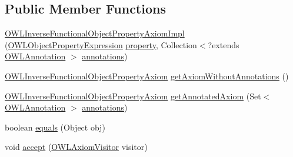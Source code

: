 \subsection*{Public Member Functions}
\begin{DoxyCompactItemize}
\item 
\hyperlink{classuk_1_1ac_1_1manchester_1_1cs_1_1owl_1_1owlapi_1_1_o_w_l_inverse_functional_object_property_axiom_impl_a158a604f393929da553f4415b8658a03}{O\-W\-L\-Inverse\-Functional\-Object\-Property\-Axiom\-Impl} (\hyperlink{interfaceorg_1_1semanticweb_1_1owlapi_1_1model_1_1_o_w_l_object_property_expression}{O\-W\-L\-Object\-Property\-Expression} \hyperlink{classuk_1_1ac_1_1manchester_1_1cs_1_1owl_1_1owlapi_1_1_o_w_l_object_property_characteristic_axiom_impl_ac99438140edc10b050c93559f367cdbb}{property}, Collection$<$?extends \hyperlink{interfaceorg_1_1semanticweb_1_1owlapi_1_1model_1_1_o_w_l_annotation}{O\-W\-L\-Annotation} $>$ \hyperlink{classuk_1_1ac_1_1manchester_1_1cs_1_1owl_1_1owlapi_1_1_o_w_l_axiom_impl_af6fbf6188f7bdcdc6bef5766feed695e}{annotations})
\item 
\hyperlink{interfaceorg_1_1semanticweb_1_1owlapi_1_1model_1_1_o_w_l_inverse_functional_object_property_axiom}{O\-W\-L\-Inverse\-Functional\-Object\-Property\-Axiom} \hyperlink{classuk_1_1ac_1_1manchester_1_1cs_1_1owl_1_1owlapi_1_1_o_w_l_inverse_functional_object_property_axiom_impl_ace7b12584d70637071a17d8d198127e3}{get\-Axiom\-Without\-Annotations} ()
\item 
\hyperlink{interfaceorg_1_1semanticweb_1_1owlapi_1_1model_1_1_o_w_l_inverse_functional_object_property_axiom}{O\-W\-L\-Inverse\-Functional\-Object\-Property\-Axiom} \hyperlink{classuk_1_1ac_1_1manchester_1_1cs_1_1owl_1_1owlapi_1_1_o_w_l_inverse_functional_object_property_axiom_impl_a1d3229fd67e0a6505d177259ece4ce31}{get\-Annotated\-Axiom} (Set$<$ \hyperlink{interfaceorg_1_1semanticweb_1_1owlapi_1_1model_1_1_o_w_l_annotation}{O\-W\-L\-Annotation} $>$ \hyperlink{classuk_1_1ac_1_1manchester_1_1cs_1_1owl_1_1owlapi_1_1_o_w_l_axiom_impl_af6fbf6188f7bdcdc6bef5766feed695e}{annotations})
\item 
boolean \hyperlink{classuk_1_1ac_1_1manchester_1_1cs_1_1owl_1_1owlapi_1_1_o_w_l_inverse_functional_object_property_axiom_impl_a452279893f62db9350f4e601614f25f0}{equals} (Object obj)
\item 
void \hyperlink{classuk_1_1ac_1_1manchester_1_1cs_1_1owl_1_1owlapi_1_1_o_w_l_inverse_functional_object_property_axiom_impl_a8533fa9482739c355a72c58491fcc3de}{accept} (\hyperlink{interfaceorg_1_1semanticweb_1_1owlapi_1_1model_1_1_o_w_l_axiom_visitor}{O\-W\-L\-Axiom\-Visitor} visitor)

\end{DoxyCompactItemize}
